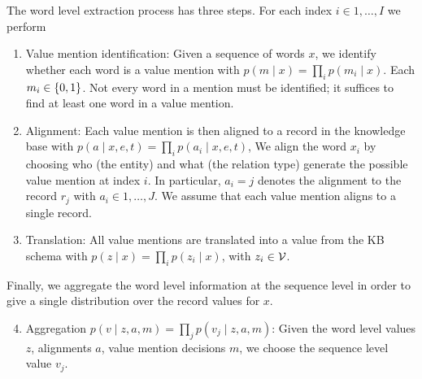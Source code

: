 \documentclass[12pt]{article}
\begin{document}
The word level extraction process has three steps.
For each index $i \in 1, \ldots, I$ we perform
\begin{enumerate}
\item Value mention identification: Given a sequence of words $x$,
    we identify whether each word is a value mention with
    $p(m \mid x) = \prod_i p(m_i \mid x)$.
    Each $m_i \in \left\{0,1\right\}$.
    Not every word in a mention must be identified; it suffices to find
    at least one word in a value mention.
\item Alignment: Each value mention is then aligned to a 
    record in the knowledge base with $p(a \mid x,e,t) = \prod_i p(a_i \mid x,e,t)$,
    We align the word $x_i$ by choosing who (the entity)
    and what (the relation type) generate the possible value mention at index $i$.
    In particular, $a_i = j$ denotes the alignment to the record $r_{j}$
    with $a_i \in 1, \ldots, J$.
    We assume that each value mention aligns to a single record.
\item Translation: All value mentions are translated
    into a value from the KB schema with
    $p(z \mid x) = \prod_i p(z_i \mid x)$, with $z_i \in \mathcal{V}$.
\end{enumerate}

Finally, we aggregate the word level information at the sequence level in order
to give a single distribution over the record values for $x$.
\begin{enumerate}
\setcounter{enumi}{3}
\item Aggregation $p(v \mid z,a,m) = \prod_j p(v_j \mid z,a,m)$:
    Given the word level values $z$, alignments $a$, value mention decisions $m$,
    we choose the sequence level value $v_j$.
\end{enumerate}
\end{document}
